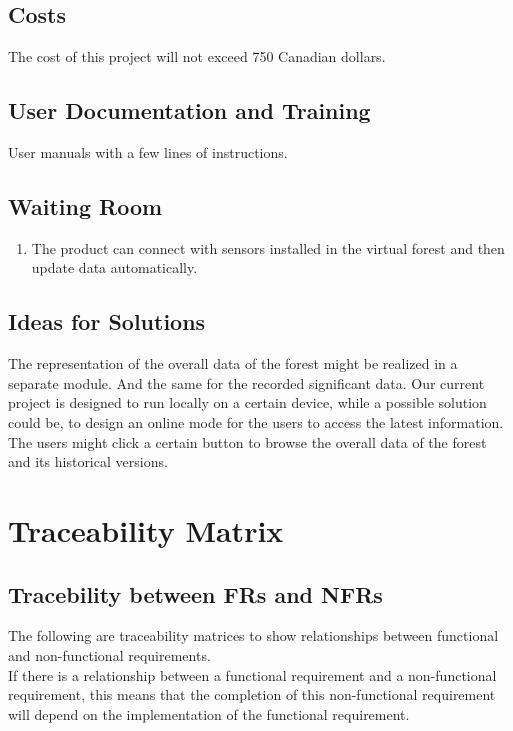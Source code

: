 \documentclass{article}
\begin{document}
\subsection{Costs}
The cost of this project will not exceed 750 Canadian dollars.
\subsection{User Documentation and Training}
User manuals with a few lines of instructions. 
\subsection{Waiting Room}
\begin{enumerate}
\item The product can connect with sensors installed in the 
virtual forest and then update data automatically. 
\end{enumerate}
\subsection{Ideas for Solutions}
The representation of the overall data of the forest might be realized in a separate module. And the same for the recorded significant data. Our current project is designed to run locally on a certain device, while a possible solution could be, to design an online mode for the users to access the latest information. The users might click a certain button to browse the overall data of the forest and its historical versions. 

\newpage

\section{Traceability Matrix}
\newcommand{\CM}{\checkmark}
\subsection{Tracebility between FRs and NFRs}
The following are traceability matrices to show relationships between
functional and non-functional requirements.\\
If there is a relationship between a functional requirement and a non-functional requirement, 
this means that the completion of this non-functional requirement will depend on the implementation of the functional requirement.
\end{document}
